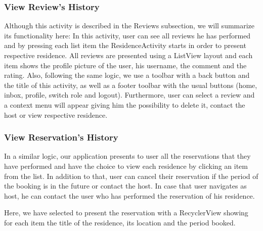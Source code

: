 \documentclass[12pt]{article}
\begin{document}
	\subsubsection{View Review's History}
	Although this activity is described in the Reviews subsection, we will summarize its functionality here:
	In this activity, user can see all reviews he has performed and by pressing each list item the ResidenceActivity starts in order to present respective residence. All reviews are presented using a ListView layout and each item shows the profile picture of the user, his username, the comment and the rating. Also, following the same logic, we use a toolbar with a back button and the title of this activity, as well as a footer toolbar with the usual buttons (home, inbox, profile, switch role and logout). Furthermore, user can select a review and a context menu will appear giving him the possibility to delete it, contact the host or view respective residence.
	
	
	\subsubsection{View Reservation's History}
	In a similar logic, our application presents to user all the reservations that they have performed and have the choice to view each residence by clicking an item from the list. In addition to that, user can cancel their reservation if the period of the booking is in the future or contact the host. In case that user navigates as host, he can contact the user who has performed the reservation of his residence.
	
	Here, we have selected to present the reservation with a RecyclerView showing for each item the title of the residence, its location and the period booked.
	
\end{document}
